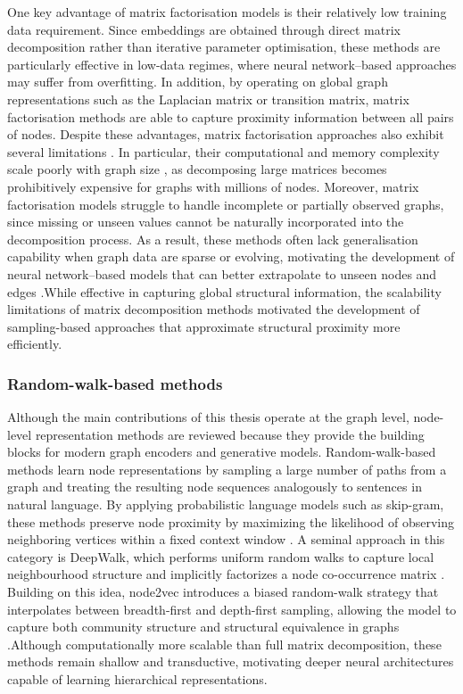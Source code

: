 One key advantage of matrix factorisation models is their relatively low training data requirement. Since embeddings are obtained through direct matrix decomposition rather than iterative parameter optimisation, these methods are particularly effective in low-data regimes, where neural network--based approaches may suffer from overfitting. In addition, by operating on global graph representations such as the Laplacian matrix or transition matrix, matrix factorisation methods are able to capture proximity information between all pairs of nodes. Despite these advantages, matrix factorisation approaches also exhibit several limitations \citep{hoang2023graph}. In particular, their computational and memory complexity scale poorly with graph size \citep{cao2015grarep}, as decomposing large matrices becomes prohibitively expensive for graphs with millions of nodes. Moreover, matrix factorisation models struggle to handle incomplete or partially observed graphs, since missing or unseen values cannot be naturally incorporated into the decomposition process. As a result, these methods often lack generalisation capability when graph data are sparse or evolving, motivating the development of neural network--based models that can better extrapolate to unseen nodes and edges \citep{dettmers2018convolutional}.While effective in capturing global structural information, the scalability limitations of matrix decomposition methods motivated the development of
sampling-based approaches that approximate structural proximity more efficiently.

\subsubsection{ Random-walk-based methods}
Although the main contributions of this thesis operate at the graph level,
node-level representation methods are reviewed because they provide the
building blocks for modern graph encoders and generative models.
Random-walk-based methods learn node representations by sampling a large number of paths from a graph and treating the resulting node sequences analogously to sentences in natural language. By applying probabilistic language models such as skip-gram, these methods preserve node proximity by maximizing the likelihood of observing neighboring vertices within a fixed context window \citep{Chen_2020}. A seminal approach in this category is DeepWalk, which performs uniform random walks to capture local neighbourhood structure and implicitly factorizes a node co-occurrence matrix \citep{perozzi2014deepwalk}. Building on this idea, node2vec introduces a biased random-walk strategy that interpolates between breadth-first and depth-first sampling, allowing the model to capture both community structure and structural equivalence in graphs \citep{grover2016node2vec}.Although computationally more scalable than full matrix decomposition,
these methods remain shallow and transductive, motivating deeper
neural architectures capable of learning hierarchical representations.

